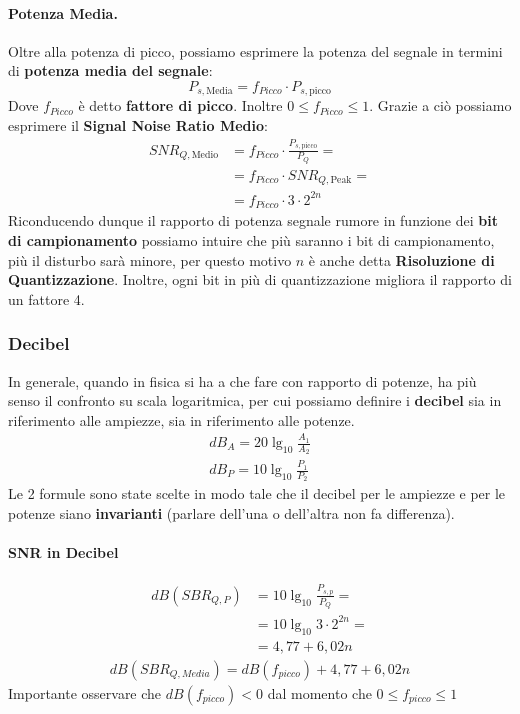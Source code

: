 \paragraph{Potenza Media.}Oltre alla potenza di picco, possiamo esprimere la potenza del segnale in termini di \textbf{potenza media del segnale}:
\begin{equation}
    P_{s,\text{Media}} = f_{Picco} \cdot P_{s,\text{picco}}
\end{equation}
Dove $f_{Picco}$ è detto \textbf{fattore di picco}. Inoltre $0 \leq f_{Picco} \leq 1$.
Grazie a ciò possiamo esprimere il \textbf{Signal Noise Ratio Medio}:
\begin{align*}
    SNR_{Q,\text{Medio}} &= f_{Picco} \cdot \frac{P_{s,\text{picco}}}{P_Q} =\\
                         &= f_{Picco} \cdot SNR_{Q,\text{Peak}} =\\
                         &=  f_{Picco} \cdot 3 \cdot 2^{2n}
\end{align*}
Riconducendo dunque il rapporto di potenza segnale rumore in funzione dei \textbf{bit di campionamento} possiamo intuire che più
saranno i bit di campionamento, più il disturbo sarà minore, per questo motivo $n$ è anche detta \textbf{Risoluzione di Quantizzazione}. Inoltre, ogni bit in più di quantizzazione migliora il rapporto di un fattore 4.

\subsubsection{Decibel}
In generale, quando in fisica si ha a che fare con rapporto di potenze, ha più senso il confronto su scala logaritmica, per cui possiamo
definire i \textbf{decibel} sia in riferimento alle ampiezze, sia in riferimento alle potenze.
\begin{gather}
    dB_A = 20 \lg_{10} \frac{A_1}{A_2} \\
    dB_P = 10 \lg_{10} \frac{P_1}{P_2} 
\end{gather}
Le 2 formule sono state scelte in modo tale che il decibel per le ampiezze e per le potenze siano \textbf{invarianti} (parlare dell'una o dell'altra non fa differenza).

\paragraph{SNR in Decibel}
\begin{align*}
    dB(SBR_{Q,P}) &= 10 \lg_{10} \frac{P_{s,p}}{P_Q}=\\
                  &= 10 \lg_{10} 3 \cdot 2^{2n} =\\
                  &= 4,77 + 6,02n
\end{align*}
\begin{align*}
    dB(SBR_{Q,Media}) = dB(f_{picco}) + 4,77 + 6,02n
\end{align*}
Importante osservare che $dB(f_{picco}) < 0$ dal momento che $0 \leq f_{picco} \leq 1$ 
